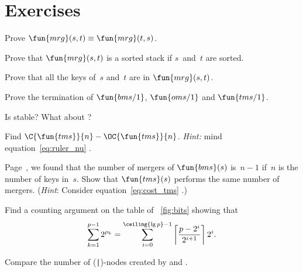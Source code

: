 \section*{Exercises}

\begin{enumerate*}

  \item Prove \(\fun{mrg}(s,t) \equiv \fun{mrg}(t,s)\).

  \item Prove that \(\fun{mrg}(s,t)\) is a sorted
  stack if \(s\)~and~\(t\) are sorted.

  \item Prove that all the keys of~\(s\) and~\(t\) are in
  \(\fun{mrg}(s,t)\).

  \item Prove the termination of \(\fun{bms/1}\), \(\fun{oms/1}\) and
    \(\fun{tms/1}\).

  \item Is  stable? What about ?

  \item Find \(\C{\fun{tms}}{n} - \OC{\fun{tms}}{n}\). \emph{Hint:}
    mind equation~\eqref{eq:ruler_nu} .

  \item Page~\pageref{eq:bms_merges}, we found that the number of
    mergers of \(\fun{bms}(s)\) is~\(n-1\) if~\(n\) is the number of
    keys in~\(s\). Show that \(\fun{tms}(s)\) performs the same number
    of mergers. (\emph{Hint}: Consider equation~\eqref{eq:cost_tms}
    .)

  \item Find a counting argument on the table of \fig~\vref{fig:bits}
    showing that
    \begin{equation*}
      \sum_{k=1}^{p-1}{2^{\rho_k}}
      = \sum_{i=0}^{\ceiling{\lg p}-1}%
      {\left\lceil\frac{p-2^i}{2^{i+1}}\right\rceil 2^i}.
    \end{equation*}

  \item Compare the number of (\texttt{|})-nodes created by
     and .

\end{enumerate*}

